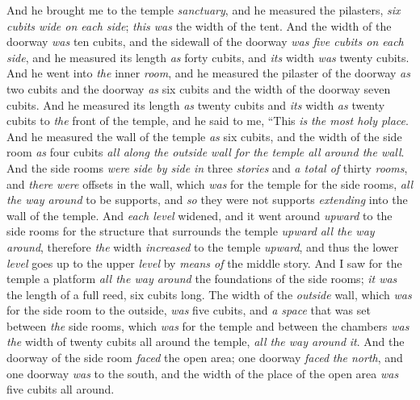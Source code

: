 \begin{biblechapter} %
 And he brought me to the temple \textit{sanctuary}, and he measured the pilasters, \textit{six cubits wide on each side}; \textit{this was} the width of the tent.
\verse And the width of the doorway \textit{was} ten cubits, and the sidewall of the doorway \textit{was five cubits on each side}, and he measured its length \textit{as} forty cubits, and \textit{its} width \textit{was} twenty cubits.
\verse And he went into \textit{the} inner \textit{room}, and he measured the pilaster of the doorway \textit{as} two cubits and the doorway \textit{as} six cubits and the width of the doorway seven cubits.
\verse And he measured its length \textit{as} twenty cubits and \textit{its} width \textit{as} twenty cubits to \textit{the} front of the temple, and he said to me, “This \textit{is} \textit{the most holy place}.
\verse And he measured the wall of the temple \textit{as} six cubits, and the width of the side room \textit{as} four cubits \textit{all along the outside wall for the temple all around the wall}.
\verse And the side rooms \textit{were} \textit{side by side} \textit{in} three \textit{stories} and \textit{a total of} thirty \textit{rooms}, and \textit{there were} offsets in the wall, which \textit{was} for the temple for the side rooms, \textit{all the way around} to be supports, and \textit{so} they were not supports \textit{extending} into the wall of the temple.
\verse And \textit{each level} widened, and it went around \textit{upward} to the side rooms for the structure that surrounds the temple \textit{upward} \textit{all the way around}, therefore \textit{the} width \textit{increased} to the temple \textit{upward}, and thus the lower \textit{level} goes up to the upper \textit{level} by \textit{means of} the middle story.
\verse And I saw for the temple a platform \textit{all the way around} the foundations of the side rooms; \textit{it was} the length of a full reed, six cubits long.
\verse The width of the \textit{outside} wall, which \textit{was} for the side room to the outside, \textit{was} five cubits, and \textit{a space} that was set between \textit{the} side rooms, which \textit{was} for the temple
\verse and between the chambers \textit{was the} width of twenty cubits all around the temple, \textit{all the way around} \textit{it}.
\verse And the doorway of the side room \textit{faced} the open area; one doorway \textit{faced} \textit{the north}, and one doorway \textit{was} to the south, and the width of the place of the open area \textit{was} five cubits all around.

\end{biblechapter}
